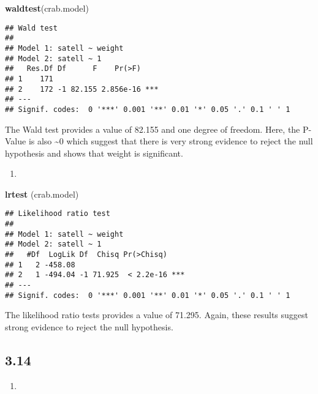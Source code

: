 \documentclass[
]{article}
\newenvironment{Shaded}{\begin{snugshade}}{\end{snugshade}}
\newcommand{\KeywordTok}[1]{\textcolor[rgb]{0.13,0.29,0.53}{\textbf{#1}}}
\newcommand{\NormalTok}[1]{#1}
\begin{document}
\begin{Shaded}
\begin{Highlighting}[]
\KeywordTok{waldtest}\NormalTok{(crab.model)}
\end{Highlighting}
\end{Shaded}

\begin{verbatim}
## Wald test
## 
## Model 1: satell ~ weight
## Model 2: satell ~ 1
##   Res.Df Df      F    Pr(>F)    
## 1    171                        
## 2    172 -1 82.155 2.856e-16 ***
## ---
## Signif. codes:  0 '***' 0.001 '**' 0.01 '*' 0.05 '.' 0.1 ' ' 1
\end{verbatim}

The Wald test provides a value of 82.155 and one degree of freedom.
Here, the P-Value is also \textasciitilde0 which suggest that there is
very strong evidence to reject the null hypothesis and shows that weight
is significant.

\begin{enumerate}
\def\labelenumi{\alph{enumi})}
\setcounter{enumi}{4}
\item
\end{enumerate}

\begin{Shaded}
\begin{Highlighting}[]
\KeywordTok{lrtest}\NormalTok{ (crab.model)}
\end{Highlighting}
\end{Shaded}

\begin{verbatim}
## Likelihood ratio test
## 
## Model 1: satell ~ weight
## Model 2: satell ~ 1
##   #Df  LogLik Df  Chisq Pr(>Chisq)    
## 1   2 -458.08                         
## 2   1 -494.04 -1 71.925  < 2.2e-16 ***
## ---
## Signif. codes:  0 '***' 0.001 '**' 0.01 '*' 0.05 '.' 0.1 ' ' 1
\end{verbatim}

The likelihood ratio tests provides a value of 71.295. Again, these
results suggest strong evidence to reject the null hypothesis.

\hypertarget{section-4}{%
\subsection{3.14}\label{section-4}}

\begin{enumerate}
\def\labelenumi{\alph{enumi})}
\item
\end{enumerate}
\end{document}
